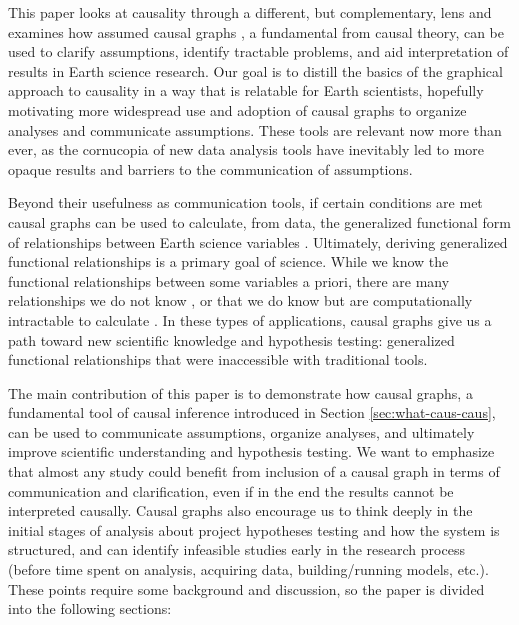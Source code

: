 \documentclass[12pt]{article}
\begin{document}
This paper looks at causality through a different, but complementary,
lens and examines how assumed causal graphs \citep{pearl1995causal}, a
fundamental from causal theory, can be used to clarify assumptions,
identify tractable problems, and aid interpretation of results in
Earth science research. Our goal is to distill \citep{olah2017} the
basics of the graphical approach to causality in a way that is
relatable for Earth scientists, hopefully motivating more widespread
use and adoption of causal graphs to organize analyses and communicate
assumptions. These tools are relevant now more than ever, as the
cornucopia of new data analysis tools have inevitably led to more
opaque results and barriers to the communication of assumptions.

Beyond their usefulness as communication tools, if certain conditions
are met causal graphs can be used to calculate, from data, the
generalized functional form of relationships between Earth science
variables \citep{pearl2009causality}. Ultimately, deriving generalized
functional relationships is a primary goal of science. While we know
the functional relationships between some variables a priori, there
are many relationships we do not know \citep[e.g., ecosystem scale
water and carbon fluxes;][]{massmann2019, zhou2019arid,
  zhou2019feedback, grossiord2020}, or that we do know but are
computationally intractable to calculate \citep[e.g., clouds and
microphysics at the global scale:][]{randall2003, gentine2018,
  zadra2018, gagne2020emulation}. In these types of applications,
causal graphs give us a path toward new scientific knowledge and
hypothesis testing: generalized functional relationships that were
inaccessible with traditional tools.

The main contribution of this paper is to demonstrate how causal
graphs, a fundamental tool of causal inference introduced in Section
\ref{sec:what-caus-caus}, can be used to communicate assumptions,
organize analyses, and ultimately improve scientific understanding and
hypothesis testing. We want to emphasize that almost any study could
benefit from inclusion of a causal graph in terms of communication and
clarification, even if in the end the results cannot be interpreted
causally. Causal graphs also encourage us to think deeply in the
initial stages of analysis about project hypotheses testing and how
the system is structured, and can identify infeasible studies early in
the research process (before time spent on analysis, acquiring data,
building/running models, etc.). These points require some background
and discussion, so the paper is divided into the following sections:
\end{document}

